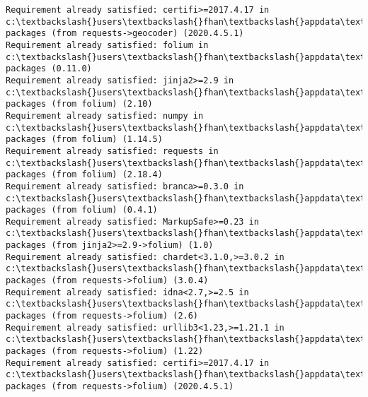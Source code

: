 \documentclass[11pt]{article}
\begin{document}
\begin{Verbatim}[commandchars=\\\{\}]
Requirement already satisfied: certifi>=2017.4.17 in c:\textbackslash{}users\textbackslash{}fhan\textbackslash{}appdata\textbackslash{}local\textbackslash{}continuum\textbackslash{}anaconda3\textbackslash{}lib\textbackslash{}site-packages (from requests->geocoder) (2020.4.5.1)
Requirement already satisfied: folium in c:\textbackslash{}users\textbackslash{}fhan\textbackslash{}appdata\textbackslash{}local\textbackslash{}continuum\textbackslash{}anaconda3\textbackslash{}lib\textbackslash{}site-packages (0.11.0)
Requirement already satisfied: jinja2>=2.9 in c:\textbackslash{}users\textbackslash{}fhan\textbackslash{}appdata\textbackslash{}local\textbackslash{}continuum\textbackslash{}anaconda3\textbackslash{}lib\textbackslash{}site-packages (from folium) (2.10)
Requirement already satisfied: numpy in c:\textbackslash{}users\textbackslash{}fhan\textbackslash{}appdata\textbackslash{}local\textbackslash{}continuum\textbackslash{}anaconda3\textbackslash{}lib\textbackslash{}site-packages (from folium) (1.14.5)
Requirement already satisfied: requests in c:\textbackslash{}users\textbackslash{}fhan\textbackslash{}appdata\textbackslash{}local\textbackslash{}continuum\textbackslash{}anaconda3\textbackslash{}lib\textbackslash{}site-packages (from folium) (2.18.4)
Requirement already satisfied: branca>=0.3.0 in c:\textbackslash{}users\textbackslash{}fhan\textbackslash{}appdata\textbackslash{}local\textbackslash{}continuum\textbackslash{}anaconda3\textbackslash{}lib\textbackslash{}site-packages (from folium) (0.4.1)
Requirement already satisfied: MarkupSafe>=0.23 in c:\textbackslash{}users\textbackslash{}fhan\textbackslash{}appdata\textbackslash{}local\textbackslash{}continuum\textbackslash{}anaconda3\textbackslash{}lib\textbackslash{}site-packages (from jinja2>=2.9->folium) (1.0)
Requirement already satisfied: chardet<3.1.0,>=3.0.2 in c:\textbackslash{}users\textbackslash{}fhan\textbackslash{}appdata\textbackslash{}local\textbackslash{}continuum\textbackslash{}anaconda3\textbackslash{}lib\textbackslash{}site-packages (from requests->folium) (3.0.4)
Requirement already satisfied: idna<2.7,>=2.5 in c:\textbackslash{}users\textbackslash{}fhan\textbackslash{}appdata\textbackslash{}local\textbackslash{}continuum\textbackslash{}anaconda3\textbackslash{}lib\textbackslash{}site-packages (from requests->folium) (2.6)
Requirement already satisfied: urllib3<1.23,>=1.21.1 in c:\textbackslash{}users\textbackslash{}fhan\textbackslash{}appdata\textbackslash{}local\textbackslash{}continuum\textbackslash{}anaconda3\textbackslash{}lib\textbackslash{}site-packages (from requests->folium) (1.22)
Requirement already satisfied: certifi>=2017.4.17 in c:\textbackslash{}users\textbackslash{}fhan\textbackslash{}appdata\textbackslash{}local\textbackslash{}continuum\textbackslash{}anaconda3\textbackslash{}lib\textbackslash{}site-packages (from requests->folium) (2020.4.5.1)

    \end{Verbatim}
\end{document}
